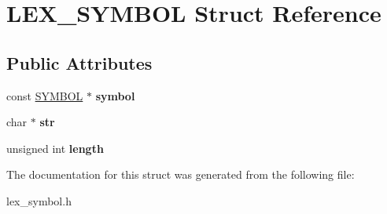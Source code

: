 \hypertarget{structLEX__SYMBOL}{}\section{L\+E\+X\+\_\+\+S\+Y\+M\+B\+OL Struct Reference}
\label{structLEX__SYMBOL}
\subsection*{Public Attributes}
\begin{DoxyCompactItemize}
\item 
\mbox{\label{structLEX__SYMBOL_a50c591ccdc761d7d77d9046e986b8914}} 
const \mbox{\hyperlink{structSYMBOL}{S\+Y\+M\+B\+OL}} $\ast$ {\bfseries symbol}
\item 
\mbox{\label{structLEX__SYMBOL_a8134e21317f2749a6c6212e1b924a7e3}} 
char $\ast$ {\bfseries str}
\item 
\mbox{\label{structLEX__SYMBOL_adacd0e3f8dcb3cf1b1668b8cdb051082}} 
unsigned int {\bfseries length}
\end{DoxyCompactItemize}


The documentation for this struct was generated from the following file\+:\begin{DoxyCompactItemize}
\item 
lex\+\_\+symbol.\+h\end{DoxyCompactItemize}
